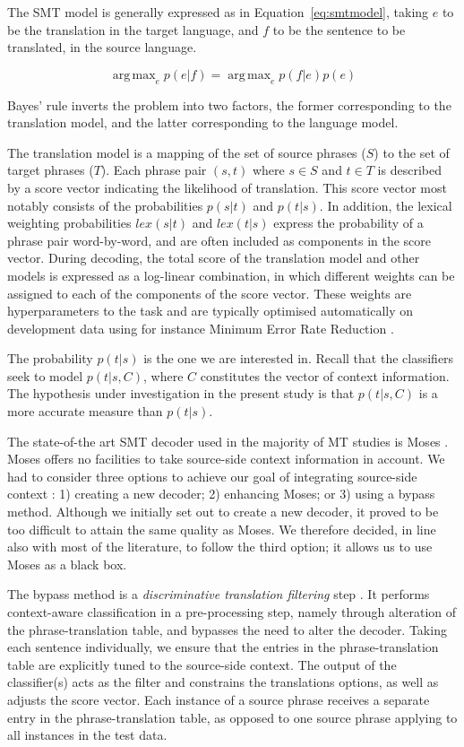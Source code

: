 \documentclass[smallextended]{svjour3}       %
\theoremstyle{break}
\DeclareMathOperator*{\argmax}{arg\,max}
\begin{document}
The SMT model is generally expressed as in Equation~\ref{eq:smtmodel}, taking $e$
to be the translation in the target language, and $f$ to be the sentence to be
translated, in the source language.

\begin{equation}
\argmax_e p(e|f) = \argmax_e p(f|e)p(e)
\label{eq:smtmodel}
\end{equation}

Bayes' rule inverts the problem into two factors, the former corresponding to
the translation model, and the latter corresponding to the language model. 

The translation model is a mapping of the set of source phrases ($S$) to the
set of target phrases ($T$). Each phrase pair $(s,t)$ where $s \in S$ and $t
\in T$ is described by a score vector indicating the likelihood of
translation. This score vector most notably consists of the probabilities
$p(s|t)$ and $p(t|s)$. In addition, the lexical weighting probabilities $lex(s|t)$
and $lex(t|s)$ express the probability of a phrase pair word-by-word, and are
often included as components in the score vector. During decoding, the total
score of the translation model and other models is expressed as a log-linear
combination, in which different weights can be assigned to each of the
components of the score vector. These weights are hyperparameters to the task and
are typically optimised automatically on development data using for instance
Minimum Error Rate Reduction \citep{MERT}.

The probability $p(t|s)$ is the one we are interested in. Recall that the
classifiers seek to model $p(t|s,C)$, where $C$ constitutes the vector of
context information. The hypothesis under investigation in the present study is
that $p(t|s,C)$ is a more accurate measure than $p(t|s)$.

The state-of-the art SMT decoder used in the majority of MT studies is Moses
\citep{MOSES}. Moses offers no facilities to take source-side context
information in account. We had to consider three options to achieve our goal of
integrating source-side context : 1) creating a new decoder; 2) enhancing
Moses; or 3) using a bypass method. Although we initially set out to create a
new decoder, it proved to be too difficult to attain the same quality as Moses.
We therefore decided, in line also with most of the literature, to follow the
third option; it allows us to use Moses as a black box.

The bypass method is a \emph{discriminative translation filtering}
step \citep{Rejwanul+11}. It performs context-aware classification in
a pre-processing step, namely through alteration of the
phrase-translation table, and bypasses the need to alter the
decoder. Taking each sentence individually, we ensure that the entries
in the phrase-translation table are explicitly tuned to the
source-side context. The output of the classifier(s) acts as the
filter and constrains the translations options, as well as adjusts the
score vector. Each instance of a source phrase receives a separate entry
in the phrase-translation table, as opposed to one source phrase
applying to all instances in the test data.
\end{document}
